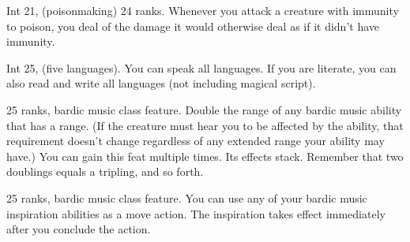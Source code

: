 {Int 21,  (poisonmaking) 24 ranks.}
{Whenever you attack a creature with immunity to poison, you deal \onehalf of the damage it would otherwise deal as if it didn't have immunity.}

{Int 25,  (five languages).}
{You can speak all languages. If you are literate, you can also read and write all languages (not including magical script).}

{}
{ 25 ranks, bardic music class feature.}
{Double the range of any bardic music ability that has a range. (If the creature must hear you to be affected by the ability, that requirement doesn't change regardless of any extended range your ability may have.)}
{}{You can gain this feat multiple times. Its effects stack. Remember that two doublings equals a tripling, and so forth.}

{ 25 ranks, bardic music class feature.}
{You can use any of your bardic music inspiration abilities as a move action. The inspiration takes effect immediately after you conclude the action.}
